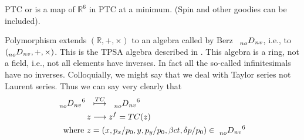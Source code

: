 \documentclass{hitec}     %
\begin{document}
{{{PTC or   is a map of  ${{\mathbb{R}}}^{6}$ in PTC at a minimum. (Spin and other goodies can be included).

Polymorphism extends $(\mathbb{R},+,\times)$ to an algebra called by Berz\cite{theberzbook} ~$\prescript{}{no}{D}_{nv} $, i.e., to $(\prescript{}{no}{D}_{nv} ,+,\times )$. This is the TPSA algebra described in  . This algebra is a ring, not a field, i.e., not all elements have inverses. In fact all the so-called infinitesimals have no inverses. Colloquially, we might say that we deal with Taylor series not Laurent series. Thus we can say very clearly that 
%
\begin{align}  {\prescript{}{no}{D}_{nv}}^{6}\ \ &\stackrel{TC}{\longmapsto}\ \ {\prescript{}{no}{D}_{nv}}^{6}  \\  z &\longrightarrow {z}^{f}=TC(z) \label{eq:ptcmap}\\~{\rm w}{\rm h}{\rm e}{\rm r}{\rm e}~z&=
\left({x,{p}_{x}/{p}_{0},y,{p}_{y}/{p}_{0},\beta ct,\delta p/{p}_{0}}\right)\in \ {\prescript{}{no}{D}_{nv}}^{6}\end{align}

}}}
\end{document}
